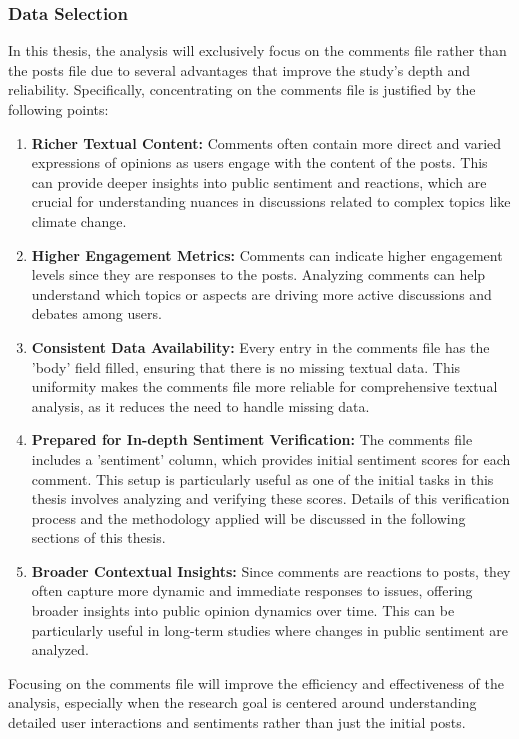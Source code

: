 \subsubsection{Data Selection}
In this thesis, the analysis will exclusively focus on the comments file rather than the posts file due to several advantages that improve the study's depth and reliability. Specifically, concentrating on the comments file is justified by the following points:
\begin{enumerate}
    \item \textbf{Richer Textual Content:} Comments often contain more direct and varied expressions of opinions as users engage with the content of the posts. This can provide deeper insights into public sentiment and reactions, which are crucial for understanding nuances in discussions related to complex topics like climate change.
    \item \textbf{Higher Engagement Metrics:} Comments can indicate higher engagement levels since they are responses to the posts. Analyzing comments can help understand which topics or aspects are driving more active discussions and debates among users.
    \item \textbf{Consistent Data Availability:} Every entry in the comments file has the 'body' field filled, ensuring that there is no missing textual data. This uniformity makes the comments file more reliable for comprehensive textual analysis, as it reduces the need to handle missing data.
    \item \textbf{Prepared for In-depth Sentiment Verification:} The comments file includes a 'sentiment' column, which provides initial sentiment scores for each comment. This setup is particularly useful as one of the initial tasks in this thesis involves analyzing and verifying these scores. Details of this verification process and the methodology applied will be discussed in the following sections of this thesis.
    \item \textbf{Broader Contextual Insights:} Since comments are reactions to posts, they often capture more dynamic and immediate responses to issues, offering broader insights into public opinion dynamics over time. This can be particularly useful in long-term studies where changes in public sentiment are analyzed.
\end{enumerate}
Focusing on the comments file will improve the efficiency and effectiveness of the analysis, especially when the research goal is centered around understanding detailed user interactions and sentiments rather than just the initial posts.

